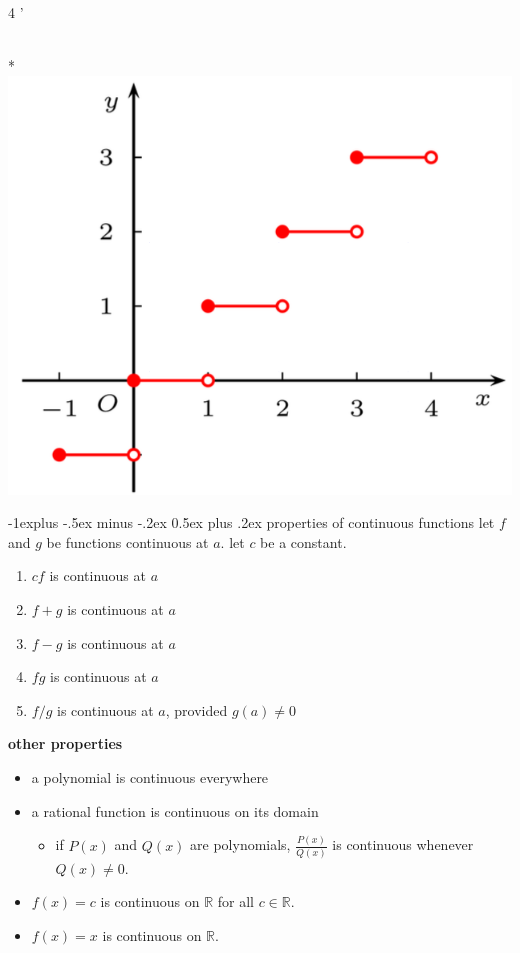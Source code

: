 \documentclass[10pt, landscape]{article}
\makeatletter
\renewcommand{\subsection}{\@startsection{subsection}{2}{0mm}%
                                {-1explus -.5ex minus -.2ex}%
                                {0.5ex plus .2ex}%
                                {\normalfont\normalsize\bfseries}}
\makeatother
\begin{document}
\begin{multicols}{4
    '}
\begin{center}
\begin{multicols*}{3}
        \\* \includegraphics[width=0.95\linewidth]{ma1102r-jump-discontinuity.png}
    \end{multicols*}
\end{center}

\subsection{properties of continuous functions}
let $f$ and $g$ be functions continuous at $a$. let $c$ be a constant.
\begin{enumerate}
    \item $cf$ is continuous at $a$
    \item $f+g$ is continuous at $a$
    \item $f-g$ is continuous at $a$
    \item $fg$ is continuous at $a$
    \item $f/g$ is continuous at $a$, provided $g(a) \neq 0$
\end{enumerate}

\textbf{other properties}
\begin{itemize}
    \item a polynomial is continuous everywhere
    \item a rational function is continuous on its domain
    \begin{itemize}
        \item if $P(x)$ and $Q(x)$ are polynomials, $\frac{P(x)}{Q(x)}$ is continuous whenever $Q(x) \neq 0$.
    \end{itemize}
    \item $f(x) = c$ is continuous on $\mathbb{R}$ for all $c \in \mathbb{R}$.
    \item $f(x) = x$ is continuous on $\mathbb{R}$.
\end{itemize}


\end{multicols}
\end{document}

